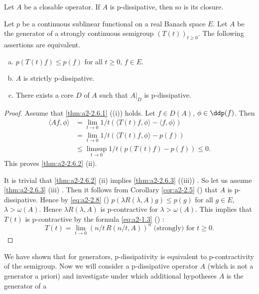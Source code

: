 \begin{corollary}\label{cor:a2-2.5}
Let $A$ be a closable operator.
If $A$ is p-dissipative, then so is its closure.
\end{corollary}
\begin{theorem}\label{thm:a2-2.6}
Let $p$ be a continuous sublinear functional on a real Banach space $E$.
Let $A$ be the generator of a strongly continuous semigroup $(T(t))_{t\geq 0}$.
The following assertions are equivalent.

\begin{enumerate}[(a)]
\item \label{thm:a2-2.6.1}
$p(T(t)f) \leq p(f)$ for all $t \geq 0$, $f \in E$.

\item \label{thm:a2-2.6.2}
$A$ is strictly p-dissipative.
 
\item \label{thm:a2-2.6.3}
There exists a core $D$ of $A$ such that $A|_{D}$ is p-dissipative.
\end{enumerate}
\end{theorem}
\begin{proof}
Assume that \ref{thm:a2-2.6.1} (\lnm (i)) holds.
Let $f \in D(A)$, $\phi \in \ddp(f)$.
Then 
\begin{align*}
	\langle Af,\phi \rangle &= \lim_{t\to 0} 1/t(\langle T(t)f,\phi \rangle - \langle f,\phi \rangle) \\
	&= \lim_{t\to 0} 1/t(\langle T(t)f,\phi \rangle - p(f)) \\
	&\leq \limsup_{t\to 0} 1/t(p(T(t)f) - p(f)) \leq 0 .
\end{align*}
This proves \ref{thm:a2-2.6.2}  (\lnm ii).

It is trivial that \ref{thm:a2-2.6.2} (\lnm ii) implies \ref{thm:a2-2.6.3} (\lnm (iii)) .
So let us assume \ref{thm:a2-2.6.3} (\lnm iii) .
Then it follows from Corollary \ref{cor:a2-2.5} () that $A$ is p-dissipative.
Hence by \eqref{eq:a2-2.8} () $p(\lambda R(\lambda,A)g) \leq p(g)$ for all $g \in E$, $\lambda > \omega(A)$.
Hence $\lambda R(\lambda,A)$ is p-contractive for $\lambda > \omega(A)$.
This implies that $T(t)$ is p-contractive by the formula \eqref{eq:a2-1.3} () :
\[
T(t) = \lim_{t\to 0} (n/t\,R(n/t,A))^{n} \text{ (strongly) for } t \geq 0.
\]
\end{proof}
We have shown that for generators, p-dissipativity is equivalent to p-contractivity of the semigroup.
Now we will consider a p-dissipative operator $A$ (which is not a generator a priori) and investigate under which additional hypotheses $A$ is the generator of a
